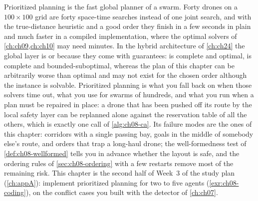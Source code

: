 \begin{dronebox}
Prioritized planning is the fast global planner of a swarm. Forty drones on a
$100 \times 100$ grid are forty space-time searches instead of one joint search, and
with the true-distance heuristic and a good order they finish in a few seconds in plain
\python and much faster in a compiled implementation, where the optimal solvers of \cref{ch:ch09,ch:ch10} may need minutes. In the hybrid architecture of
\cref{ch:ch24} the global layer is \cbs or \ecbs because they come with guarantees:
\cbs is complete and optimal, \ecbs is complete and bounded-suboptimal, whereas the
plan of this chapter can be arbitrarily worse than optimal and may not exist for the
chosen order although the instance is solvable. Prioritized planning is what you fall
back on when those solvers time out, what you use for swarms of hundreds, and what you
run when a plan must be repaired in place: a drone that has been pushed off its route
by the local safety layer can be replanned alone against the reservation table of
all the others, which is exactly one call of \cref{alg:ch08-ca}. Its failure modes are
the ones of this chapter: corridors with a single passing bay, goals in the middle of
somebody else's route, and orders that trap a long-haul drone; the well-formedness
test of \cref{def:ch08-wellformed} tells you in advance whether the layout is safe, and
the ordering rules of \cref{sec:ch08-ordering} with a few restarts remove most of the
remaining risk. This chapter is the second half of Week~3 of the study plan (\cref{ch:appA}): implement
prioritized planning for two to five agents (\cref{exr:ch08-coding}), on the conflict
cases you built with the detector of \cref{ch:ch07}.
\end{dronebox}

